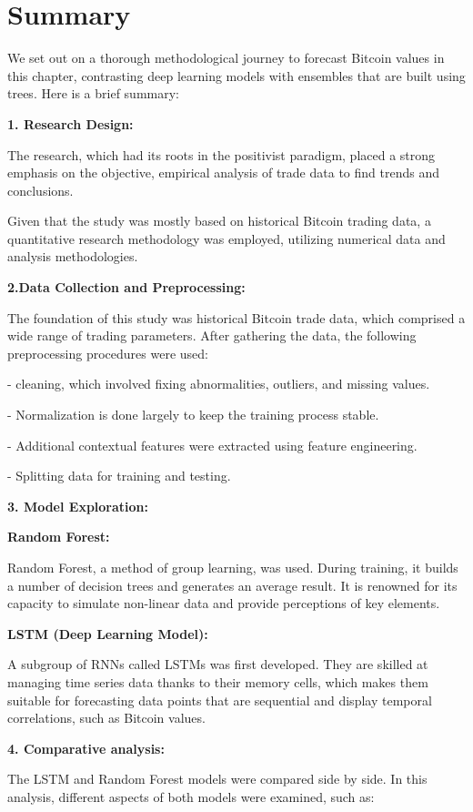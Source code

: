 \section{Summary} 

We set out on a thorough methodological journey to forecast Bitcoin values in this chapter, contrasting deep learning models with ensembles that are built using trees. Here is a brief summary:

\textbf{1. Research Design:}

The research, which had its roots in the positivist paradigm, placed a strong emphasis on the objective, empirical analysis of trade data to find trends and conclusions.

Given that the study was mostly based on historical Bitcoin trading data, a quantitative research methodology was employed, utilizing numerical data and analysis methodologies.

\textbf{2.Data Collection and Preprocessing:}

The foundation of this study was historical Bitcoin trade data, which comprised a wide range of trading parameters. After gathering the data, the following preprocessing procedures were used:

-	cleaning, which involved fixing abnormalities, outliers, and missing values.

-	Normalization is done largely to keep the training process stable.

-	Additional contextual features were extracted using feature engineering.

-	Splitting data for training and testing.

\textbf{3. Model Exploration:}

\textbf{Random Forest:}

Random Forest, a method of group learning, was used. During training, it builds a number of decision trees and generates an average result. It is renowned for its capacity to simulate non-linear data and provide perceptions of key elements.

\textbf{LSTM (Deep Learning Model):}

A subgroup of RNNs called LSTMs was first developed. They are skilled at managing time series data thanks to their memory cells, which makes them suitable for forecasting data points that are sequential and display temporal correlations, such as Bitcoin values.

\textbf{4. Comparative analysis:}

The LSTM and Random Forest models were compared side by side. In this analysis, different aspects of both models were examined, such as:

